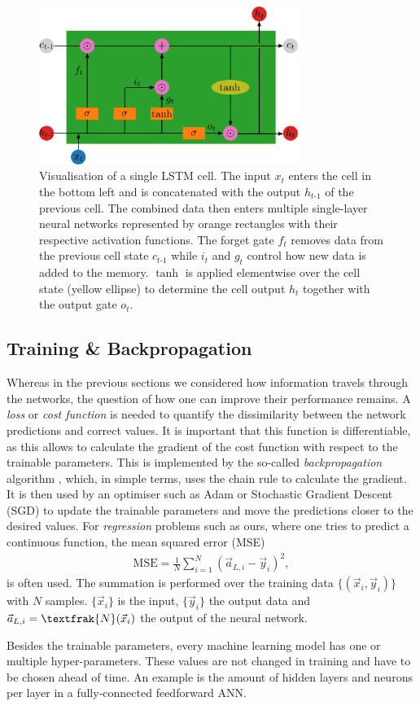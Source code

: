 \begin{figure}[h]
	\centering
	\includegraphics[width=0.75\textwidth]{img/lstm}
	\caption{Visualisation of a single LSTM cell. The input $x_t$ enters the cell in the bottom left and is concatenated with the output $h_{t\text{-}1}$ of the previous cell. The combined data then enters multiple single-layer neural networks represented by orange rectangles with their respective activation functions. The forget gate $f_t$ removes data from the previous cell state $c_{t\text{-}1}$ while $i_t$ and $g_t$ control how new data is added to the memory. $\tanh$ is applied elementwise over the cell state (yellow ellipse) to determine the cell output $h_t$ together with the output gate $o_t$.}
	\label{lstm}
\end{figure}

\newpage

\subsection{Training \& Backpropagation} \label{trainbackprop}
Whereas in the previous sections we considered how information travels through the networks, the question of how one can improve their performance remains.
A \textit{loss} or \textit{cost function} is needed to quantify the dissimilarity between the network predictions and correct values.
It is important that this function is differentiable, as this allows to calculate the gradient of the cost function with respect to the trainable parameters.
This is implemented by the so-called \textit{backpropagation} algorithm \cite{rumelhart1986learning, nielsenneural}, which, in simple terms, uses the chain rule to calculate the gradient.
It is then used by an optimiser such as Adam \cite{kingma2017adam} or Stochastic Gradient Descent (SGD) to update the trainable parameters and move the predictions closer to the desired values.
For \textit{regression} problems such as ours, where one tries to predict a continuous function, the mean squared error (MSE)
\begin{align*}
\mathrm{MSE} = \frac{1}{N} \sum_{i=1}^N (\vec{a}_{L, i} - \vec{y}_i)^2,
\end{align*}
is often used.
The summation is performed over the training data $\{(\vec{x}_i, \vec{y}_i)\}$ with $N$ samples.
$\{\vec{x}_i\}$ is the input, $\{\vec{y}_i\}$ the output data and $\vec{a}_{L, i} = \textfrak{N}(\vec{x}_i)$ the output of the neural network.

Besides the trainable parameters, every machine learning model has one or multiple hyper-parameters.
These values are not changed in training and have to be chosen ahead of time.
An example is the amount of hidden layers and neurons per layer in a fully-connected feedforward ANN.
